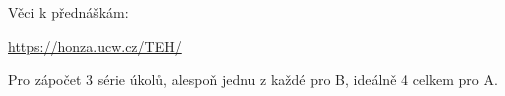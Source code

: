 \documentclass[../main.tex]{subfiles}
\begin{document}
Věci k přednáškám:

\hyperlink{https://honza.ucw.cz/TEH/}{https://honza.ucw.cz/TEH/}

Pro zápočet 3 série úkolů, alespoň jednu z každé pro B, ideálně 4 celkem pro A. 
\end{document}
